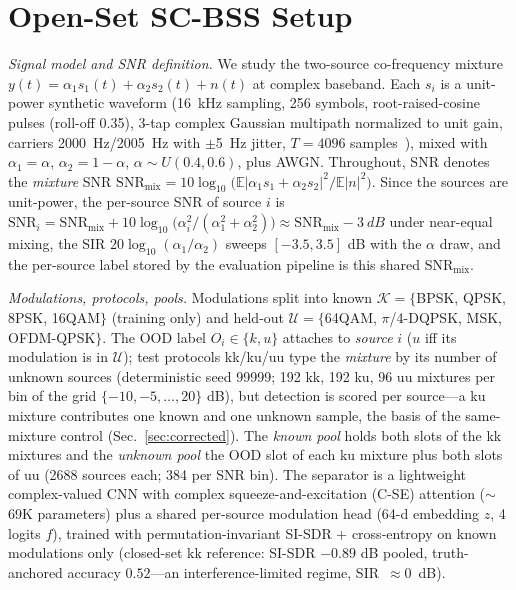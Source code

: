 \documentclass[journal,letterpaper]{IEEEtran}
\newcommand{\snr}{\mathrm{SNR}}
\begin{document}
\section{Open-Set SC-BSS Setup}
\label{sec:setup}

\emph{Signal model and SNR definition.} We study the two-source
co-frequency mixture $y(t) = \alpha_1 s_1(t) + \alpha_2 s_2(t) + n(t)$
at complex baseband. Each $s_i$ is a unit-power synthetic waveform
(\SI{16}{kHz} sampling, 256 symbols, root-raised-cosine pulses
(roll-off 0.35), 3-tap complex Gaussian multipath normalized to unit
gain, carriers \SI{2000}{Hz}/\SI{2005}{Hz} with $\pm$\SI{5}{Hz} jitter,
$T = 4096$ samples~\cite{proakis2008digital}), mixed with
$\alpha_1 = \alpha$, $\alpha_2 = 1 - \alpha$, $\alpha \sim U(0.4,
0.6)$, plus AWGN\@. Throughout, SNR denotes the \emph{mixture} SNR
$\snr_{\text{mix}} = 10\log_{10}\bigl(\mathbb{E}|\alpha_1 s_1 +
\alpha_2 s_2|^2 / \mathbb{E}|n|^2\bigr)$. Since the sources are
unit-power, the per-source SNR of source $i$ is
$\snr_i = \snr_{\text{mix}} + 10\log_{10}\!\bigl(\alpha_i^2 /
(\alpha_1^2 + \alpha_2^2)\bigr) \approx \snr_{\text{mix}} -
\SI{3}{dB}$ under near-equal mixing, the SIR
$20\log_{10}(\alpha_1/\alpha_2)$ sweeps $[-3.5, 3.5]$ dB with the
$\alpha$ draw, and the per-source label stored by the evaluation
pipeline is this shared $\snr_{\text{mix}}$.

\emph{Modulations, protocols, pools.} Modulations split into known
$\mathcal{K} = \{$BPSK, QPSK, 8PSK, 16QAM$\}$ (training only) and
held-out $\mathcal{U} = \{$64QAM, $\pi$/4-DQPSK, MSK, OFDM-QPSK$\}$.
The OOD label $O_i \in \{k, u\}$ attaches to \emph{source} $i$ ($u$
iff its modulation is in $\mathcal{U}$); test protocols
kk/ku/uu type the
\emph{mixture} by its number of unknown sources (deterministic seed
99999; 192 kk, 192 ku, 96 uu mixtures per bin of the grid
$\{-10, -5, \dots, 20\}$ dB), but detection is scored per source---a
ku mixture contributes one known and one unknown sample, the basis of
the same-mixture control (Sec.~\ref{sec:corrected}). The \emph{known pool} holds
both slots of the kk mixtures and the \emph{unknown pool} the OOD slot
of each ku mixture plus both slots of uu (2688 sources each; 384 per
SNR bin). The separator is a lightweight complex-valued CNN with
complex squeeze-and-excitation (C-SE) attention ($\sim$69K parameters)
plus a shared per-source modulation head (64-d embedding $z$, 4 logits
$f$), trained with permutation-invariant SI-SDR + cross-entropy
\cite{kolbaek2017pit,leroux2019sdr} on known modulations only
(closed-set kk reference: SI-SDR $-0.89$ dB pooled, truth-anchored
accuracy $0.52$---an interference-limited regime, SIR~$\approx 0$~dB).
\end{document}
